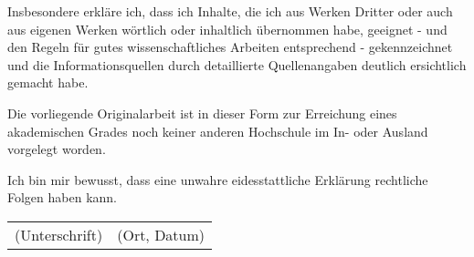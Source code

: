 {Insbesondere erkläre ich, dass ich Inhalte, die ich aus Werken Dritter oder auch aus eigenen Werken wörtlich oder inhaltlich übernommen habe, geeignet - und den Regeln für gutes wissenschaftliches Arbeiten entsprechend - gekennzeichnet und die Informationsquellen durch detaillierte Quellenangaben deutlich ersichtlich gemacht habe.

Die vorliegende Originalarbeit ist in dieser Form zur Erreichung eines akademischen Grades noch keiner anderen Hochschule im In- oder Ausland vorgelegt worden.

Ich bin mir bewusst, dass eine unwahre eidesstattliche Erklärung rechtliche Folgen haben kann.


\vspace{2.5cm}

\begin{tabular*}{\textwidth}{@{\extracolsep{\fill}}cc}
(Unterschrift) & (Ort, Datum)
\end{tabular*}

\vspace{2cm}

\begin{tabular}{p{10.2cm}r}
\end{tabular}
}